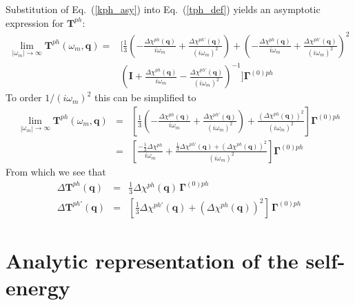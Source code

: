 Substitution of Eq.~(\ref{kph_asy}) into
Eq.~(\ref{tph_def}) yields an asymptotic expression
for $\mathbf{T}^{ph}$:
\begin{equation}
\begin{split}
\lim_{|\omega_m| \to \infty}
\mathbf{T}^{ph}(\omega_m,\mathbf{q})  = &
\bigg[\frac{1}{3}
\left( - \frac{\Delta \chi^{ph}(\mathbf{q})}{i \omega_m}
+ \frac{\Delta \chi^{ph \prime}(\mathbf{q})}{(i \omega_m)^2}\right) 
 + 
\left(- \frac{\Delta \chi^{ph}(\mathbf{q})}{i \omega_m}
+ \frac{\Delta \chi^{ph \prime}(\mathbf{q})}{(i \omega_m)^2}\right)^2 
\\
&
\left(\mathbf{I} + \frac{\Delta \chi^{ph}(\mathbf{q})}{i \omega_m}
- \frac{\Delta \chi^{ph \prime}(\mathbf{q})}{(i \omega_m)^2}\right)^{-1} 
\bigg]
\mathbf{\Gamma}^{(0)ph}
\end{split}
\end{equation}
To order $1/(i\omega_m)^2$ this can be simplified to
\begin{eqnarray}
\lim_{|\omega_m| \to \infty}
\mathbf{T}^{ph}(\omega_m,\mathbf{q})  & = & 
\left[\frac{1}{3}
\left( - \frac{\Delta \chi^{ph}(\mathbf{q})}{i \omega_m}
+ \frac{\Delta \chi^{ph \prime}(\mathbf{q})}{(i \omega_m)^2}\right) 
 + 
\frac{\left(\Delta \chi^{ph}(\mathbf{q})\right)^2}{(i \omega_m)^2}
\right]
\mathbf{\Gamma}^{(0)ph} \\
& = & \left[\frac{ - \frac{1}{3}\Delta \chi^{ph}}{i \omega_m}
+ \frac{ \frac{1}{3} \Delta \chi^{ph \prime}(\mathbf{q}) 
+ \left(\Delta \chi^{ph}(\mathbf{q})\right)^2}{(i\omega_m)^2}
\right] \mathbf{\Gamma}^{(0)ph}
\end{eqnarray}
From which we see that
\begin{eqnarray}
\Delta \mathbf{T}^{ph}(\mathbf{q}) & = &
\frac{1}{3} \Delta \chi^{ph}(\mathbf{q})\,\mathbf{\Gamma}^{(0)ph} \\
\Delta \mathbf{T}^{ph\prime}(\mathbf{q}) & = & \left[
\frac{1}{3} \Delta \chi^{ph \prime}(\mathbf{q}) 
+ \left(\Delta \chi^{ph}(\mathbf{q})\right)^2 \right]\,
\mathbf{\Gamma}^{(0)ph}
\end{eqnarray}

\section{Analytic representation of the self-energy}

